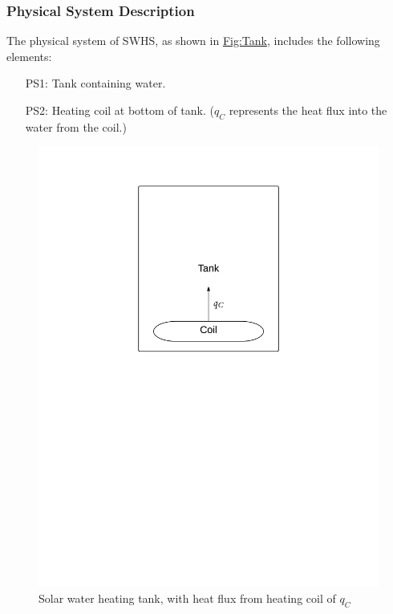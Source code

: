 \documentclass[12pt]{article}
\begin{document}
\subsubsection{Physical System Description}
\label{Sec:PhysSyst}
The physical system of SWHS, as shown in \hyperref[Figure:Tank]{Fig:Tank}, includes the following elements:
\begin{itemize}
\item[PS1:]Tank containing water.
\item[PS2:]Heating coil at bottom of tank. (${q_{C}}$ represents the heat flux into the water from the coil.)
\end{itemize}
\begin{figure}
\begin{center}
\includegraphics[width=\textwidth]{../../../datafiles/NoPCM/TankWaterOnly.png}
\caption{Solar water heating tank, with heat flux from heating coil of ${q_{C}}$}
\label{Figure:Tank}
\end{center}
\end{figure}
\end{document}

